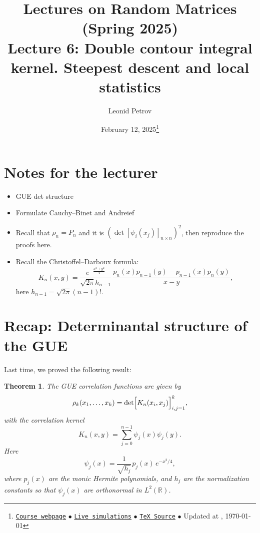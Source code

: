 \documentclass[letterpaper,11pt,oneside,reqno]{article}
\numberwithin{equation}{section}
\newcommand{\ssp}{\hspace{1pt}}
\newtheorem{theorem}[proposition]{Theorem}
\theoremstyle{definition}
\newenvironment{lnotes}{\section*{Notes for the lecturer}}{}
\begin{document}
\title{Lectures on Random Matrices
(Spring 2025)
\\Lecture 6: Double contour integral kernel. Steepest descent and local statistics}

\date{February 12, 2025\footnote{\href{https://lpetrov.cc/rmt25/}{\texttt{Course webpage}}
$\bullet$ \href{https://lpetrov.cc/simulations/model/random-matrices/}{\texttt{Live simulations}}
$\bullet$ \href{https://lpetrov.cc/rmt25/rmt25-notes/rmt2025-l06.tex}{\texttt{TeX Source}}
$\bullet$
Updated at \currenttime, \today}}

\author{Leonid Petrov}

\maketitle
\tableofcontents

\begin{lnotes}

\begin{itemize}
	\item GUE det structure

	\item Formulate Cauchy--Binet and Andreief

	\item Recall that $\rho_n=P_n$ and it is
	$\left( \det[\psi_i(x_j)]_{n\times n} \right)^2$, then reproduce the proofs here.

	\item Recall the Christoffel--Darboux formula:
	\begin{equation*}
		K_n(x,y)=\frac{e^{-\frac{x^2+y^2}{4}}}{\sqrt{2\pi}
		h_{n-1}}\,\frac{p_n(x)p_{n-1}(y)-p_{n-1}(x)p_n(y)}{x-y},
	\end{equation*}
	here $h_{n-1}=\sqrt{2\pi}(n-1)!$.
\end{itemize}

\end{lnotes}

\section{Recap: Determinantal structure of the GUE}

Last time, we proved the following result:
\begin{theorem}
\label{thm:determinantal_GUE}
The GUE correlation functions are given by
\[
\rho_k(x_1,\dots,x_k)=\det\Bigl[K_n(x_i,x_j)\Bigr]_{i,j=1}^k,
\]
with the correlation kernel
\[
K_n(x,y)=\sum_{j=0}^{n-1}\psi_j(x)\psi_j(y).
\]
Here
\begin{equation*}
	\psi_j(x)=\frac{1}{\sqrt{h_j}}\ssp p_j(x)\,e^{-x^2/4},
\end{equation*}
where \(p_j(x)\) are the monic Hermite polynomials, and \(h_j\) are the normalization constants so that
$\psi_j(x)$ are orthonormal in $L^2(\mathbb{R})$.
\end{theorem}
\end{document}
